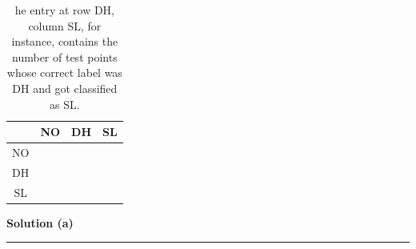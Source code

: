 \documentclass{article}
\begin{document}
\begin{table}[h]
\centering
\begin{tabular}{c|c|c|c}
  & NO & DH & SL \\ \hline
NO &   &   &   \\ \hline
DH &   &   &   \\ \hline
SL &   &   &   \\ \hline
\end{tabular}
\caption{he entry at row DH, column SL, for instance, contains the number of test points whose correct
label was DH and got classified as SL.}
\label{tab:empty3x3}
\end{table}


\textbf{Solution (a)}

\noindent\rule{\textwidth}{0.4pt}\\
\end{document}
